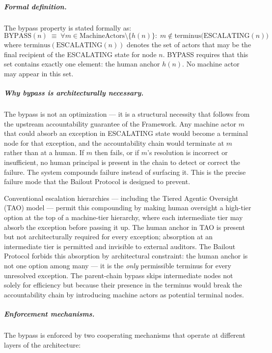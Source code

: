 \subparagraph{Formal definition.} The bypass property is stated formally as:
\begin{equation}
\text{BYPASS}(n) \;\equiv\; \forall m \in \text{MachineActors} \setminus \{h(n)\}:\; m \notin \text{terminus}\bigl(\text{ESCALATING}(n)\bigr) \tag{BP}
\end{equation}
where $\text{terminus}(\text{ESCALATING}(n))$ denotes the set of actors that may be the final recipient of the ESCALATING state for node $n$. BYPASS requires that this set contains exactly one element: the human anchor $h(n)$. No machine actor may appear in this set.

\subparagraph{Why bypass is architecturally necessary.} The bypass is not an optimization — it is a structural necessity that follows from the upstream accountability guarantee of the \bxthree{} Framework. Any machine actor $m$ that could absorb an exception in ESCALATING state would become a terminal node for that exception, and the accountability chain would terminate at $m$ rather than at a human. If $m$ then fails, or if $m$'s resolution is incorrect or insufficient, no human principal is present in the chain to detect or correct the failure. The system compounds failure instead of surfacing it. This is the precise failure mode that the Bailout Protocol is designed to prevent.

Conventional escalation hierarchies — including the Tiered Agentic Oversight (TAO) model — permit this compounding by making human oversight a high-tier option at the top of a machine-tier hierarchy, where each intermediate tier may absorb the exception before passing it up. The human anchor in TAO is present but not architecturally required for every exception; absorption at an intermediate tier is permitted and invisible to external auditors. The Bailout Protocol forbids this absorption by architectural constraint: the human anchor is not one option among many — it is the \emph{only} permissible terminus for every unresolved exception. The parent-chain bypass skips intermediate nodes not solely for efficiency but because their presence in the terminus would break the accountability chain by introducing machine actors as potential terminal nodes.

\subparagraph{Enforcement mechanisms.} The bypass is enforced by two cooperating mechanisms that operate at different layers of the \bxthree{} architecture:

